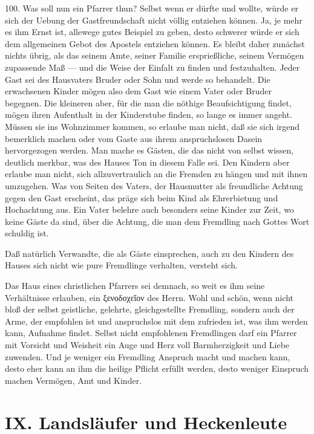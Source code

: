 100. Was soll nun ein Pfarrer thun? Selbst wenn er dürfte und wollte, würde er sich der Uebung der Gastfreundschaft nicht völlig entziehen können. Ja, je mehr es ihm Ernst ist, allewege gutes Beispiel zu geben, desto schwerer würde er sich dem allgemeinen Gebot des Apostels entziehen können. Es bleibt daher zunächst nichts übrig, als das seinem Amte, seiner Familie ersprießliche, seinem Vermögen zupassende Maß — und die Weise der Einfalt zu finden und festzuhalten. Jeder Gast sei des Hausvaters Bruder oder Sohn und werde so behandelt. Die erwachsenen Kinder mögen also dem Gast wie einem Vater oder Bruder begegnen. Die kleineren aber, für die man die nöthige Beaufsichtigung findet, mögen ihren Aufenthalt in der Kinderstube finden, so lange es immer angeht. Müssen sie ins Wohnzimmer kommen, so erlaube man nicht, daß sie sich irgend bemerklich machen oder vom Gaste aus ihrem anspruchslosen Dasein hervorgezogen werden. Man mache es Gästen, die das nicht von selbst wissen, deutlich merkbar, was des Hauses Ton in diesem Falle sei. Den Kindern aber erlaube man nicht, sich allzuvertraulich
an die Fremden zu hängen und mit ihnen umzugehen. Was von Seiten des Vaters, der Hausmutter als freundliche Achtung gegen den Gast erscheint, das präge sich beim Kind als Ehrerbietung und Hochachtung aus. Ein Vater belehre auch besonders seine Kinder zur Zeit, wo keine Gäste da sind, über die Achtung, die man dem Fremdling nach Gottes Wort schuldig ist.

Daß natürlich Verwandte, die als Gäste einsprechen, auch zu den Kindern des Hauses sich nicht wie pure Fremdlinge verhalten, versteht sich.

Das Haus eines christlichen Pfarrers sei demnach, so weit es ihm seine Verhältnisse erlauben, ein ξενοδοχεῖον des Herrn. Wohl und schön, wenn nicht bloß der selbst geistliche, gelehrte, gleichgestellte Fremdling, sondern auch der Arme, der empfohlen ist und anspruchslos mit dem zufrieden ist, was ihm werden kann, Aufnahme findet. Selbst nicht empfohlenen Fremdlingen darf ein Pfarrer mit Vorsicht und Weisheit ein Auge und Herz voll Barmherzigkeit und Liebe zuwenden. Und je weniger ein Fremdling Anspruch macht und machen kann, desto eher kann an ihm die heilige Pflicht erfüllt werden, desto weniger Einspruch machen Vermögen, Amt und Kinder.

\section{IX. Landsläufer und Heckenleute}

